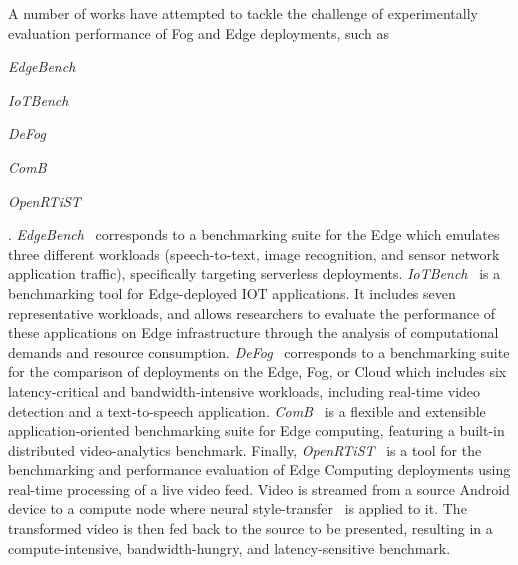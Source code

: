 
A number of works have attempted to tackle the challenge of experimentally evaluation performance of Fog and Edge deployments, such as 
\begin{inlineenum}
    \item \emph{EdgeBench}~\cite{das2018edgebench}
    \item \emph{IoTBench}~\cite{lee2019iotbench}
    \item \emph{DeFog}~\cite{mcchesney2019defog}
    \item \emph{ComB}~\cite{baurle2022comb}
    \item \emph{OpenRTiST}~\cite{george2020openrtist}
\end{inlineenum}.
\emph{EdgeBench}~\cite{das2018edgebench} corresponds to a benchmarking suite for the Edge which emulates three different workloads (speech-to-text, image recognition, and sensor network application traffic), specifically targeting serverless deployments.\@
\emph{IoTBench}~\cite{lee2019iotbench} is a benchmarking tool for Edge-deployed \gls{IOT} applications.
It includes seven representative workloads, and allows researchers to evaluate the performance of these applications on Edge infrastructure through the analysis of computational demands and resource consumption.\@
\emph{DeFog}~\cite{mcchesney2019defog} corresponds to a benchmarking suite for the comparison of deployments on the Edge, Fog, or Cloud which includes six latency-critical and bandwidth-intensive workloads, including real-time video detection and a text-to-speech application.
\emph{ComB}~\cite{baurle2022comb} is a flexible and extensible application-oriented benchmarking suite for Edge computing, featuring a built-in distributed video-analytics benchmark.
Finally, \emph{OpenRTiST}~\cite{george2020openrtist} is a tool for the benchmarking and performance evaluation of Edge Computing deployments using real-time processing of a live video feed.
Video is streamed from a source Android device to a compute node where neural style-transfer~\cite{gatys2016image} is applied to it.
The transformed video is then fed back to the source to be presented, resulting in a compute-intensive, bandwidth-hungry, and latency-sensitive benchmark.

